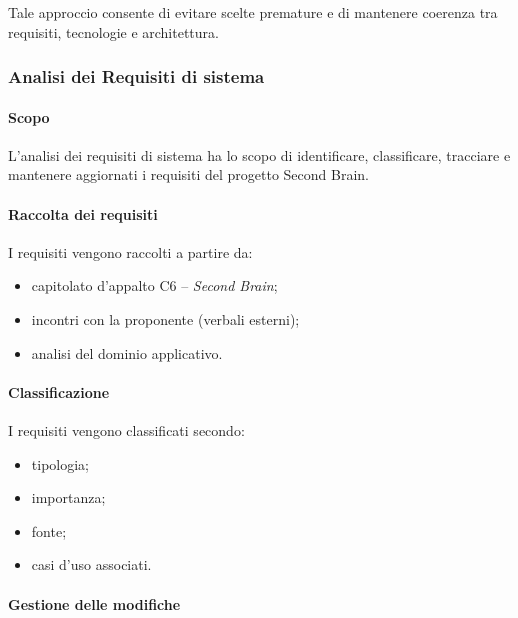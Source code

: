 Tale approccio consente di evitare scelte premature e di mantenere coerenza tra
requisiti, tecnologie e architettura.


\subsubsection{Analisi dei Requisiti di sistema}

\paragraph{Scopo}

L'analisi dei requisiti di sistema ha lo scopo di identificare, classificare, tracciare e mantenere
aggiornati i requisiti del progetto Second Brain.

\paragraph{Raccolta dei requisiti}

I requisiti vengono raccolti a partire da:

\begin{itemize}
    \item capitolato d'appalto C6 -- \textit{Second Brain};
    \item incontri con la proponente (verbali esterni);
    \item analisi del dominio applicativo.
\end{itemize}

\paragraph{Classificazione}

I requisiti vengono classificati secondo:

\begin{itemize}
    \item tipologia;
    \item importanza;
    \item fonte;
    \item casi d'uso associati.
\end{itemize}

\paragraph{Gestione delle modifiche}

